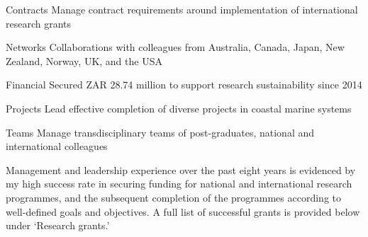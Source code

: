 


\begin{cvskills}

    \cvskill
    {Contracts}
    {Manage contract requirements around implementation of international research grants}
    
    \cvskill
    {Networks}
    {Collaborations with colleagues from Australia, Canada, Japan, New Zealand, Norway, UK, and the USA}

    \cvskill
    {Financial}
    {Secured ZAR 28.74 million to support research sustainability since 2014}
    
    \cvskill
    {Projects}
    {Lead effective completion of diverse projects in coastal marine systems}
    
    \cvskill
    {Teams}
    {Manage transdisciplinary teams of post-graduates, national and international colleagues}
    
\end{cvskills}

Management and leadership experience over the past eight years is evidenced by my high success rate in securing funding for national and international research programmes, and the subsequent completion of the programmes according to well-defined goals and objectives. A full list of successful grants is provided below under `Research grants.'